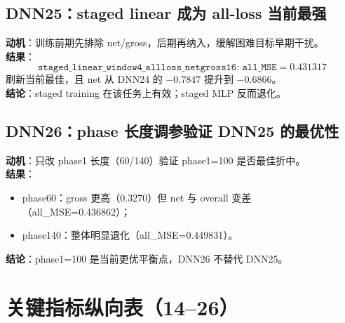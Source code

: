 \documentclass[UTF8]{ctexart}
\begin{document}
\subsection{DNN25：staged linear 成为 all-loss 当前最强}

\textbf{动机}：训练前期先排除 net/gross，后期再纳入，缓解困难目标早期干扰。\\
\textbf{结果}：
\[
\texttt{staged\_linear\_window4\_allloss\_netgross16: all\_MSE}=0.431317
\]
刷新当前最佳，且 net 从 DNN24 的 \(-0.7847\) 提升到 \(-0.6866\)。\\
\textbf{结论}：staged training 在该任务上有效；staged MLP 反而退化。

\subsection{DNN26：phase 长度调参验证 DNN25 的最优性}

\textbf{动机}：只改 phase1 长度（60/140）验证 phase1=100 是否最佳折中。\\
\textbf{结果}：
\begin{itemize}
    \item phase60：gross 更高（0.3270）但 net 与 overall 变差（all\_MSE=0.436862）；
    \item phase140：整体明显退化（all\_MSE=0.449831）。
\end{itemize}
\textbf{结论}：phase1=100 是当前更优平衡点，DNN26 不替代 DNN25。

\section{关键指标纵向表（14--26）}
\end{document}
